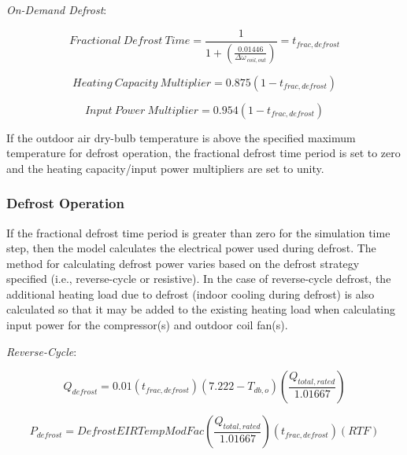 \emph{On-Demand Defrost}:

\begin{equation}
Fractional~Defrost~Time = \frac{1}{{1 + \left( {\frac{{0.01446}}{{\Delta {\omega_{\,coil,out}}}}} \right)}} = {t_{frac,defrost}}
\end{equation}

\begin{equation}
Heating~Capacity~Multiplier = 0.875\left( {1 - {t_{frac,defrost}}} \right)
\label{eq:SSEHPDXHeatingCapacityMultiplierOnDemandDefrost}
\end{equation}

\begin{equation}
Input~Power~Multiplier = 0.954\left( {1 - {t_{frac,defrost}}} \right)
\label{eq:SSEHPDXInputPowerMultiplierOnDemandDefrost}
\end{equation}

If the outdoor air dry-bulb temperature is above the specified maximum temperature for defrost operation, the fractional defrost time period is set to zero and the heating capacity/input power multipliers are set to unity.

\subsubsection{Defrost Operation}\label{defrost-operation}

If the fractional defrost time period is greater than zero for the simulation time step, then the model calculates the electrical power used during defrost. The method for calculating defrost power varies based on the defrost strategy specified (i.e., reverse-cycle or resistive). In the case of reverse-cycle defrost, the additional heating load due to defrost (indoor cooling during defrost) is also calculated so that it may be added to the existing heating load when calculating input power for the compressor(s) and outdoor coil fan(s).

\emph{Reverse-Cycle}:

\begin{equation}
{Q_{defrost}} = 0.01\left( {{t_{frac,defrost}}} \right)\left( {7.222 - {T_{db,o}}} \right)\left( {\frac{{{Q_{total,rated}}}}{{1.01667}}} \right)
\end{equation}

\begin{equation}
{P_{defrost}} = DefrostEIRTempModFac\left( {\frac{{{Q_{total,rated}}}}{{1.01667}}} \right)\left( {{t_{frac,defrost}}} \right)\left( {RTF} \right)
\end{equation}

